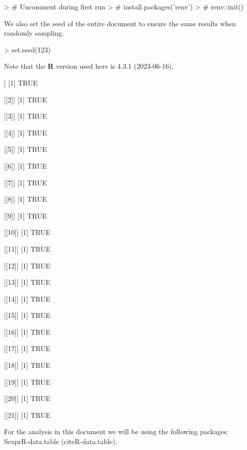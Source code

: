 \documentclass{article}
\begin{document}
\begin{Schunk}
\begin{Sinput}
> # Uncomment during first run
> # install.packages('renv')
> # renv::init()
\end{Sinput}
\end{Schunk}

We also set the seed of the entire document to ensure the same results when randomly sampling.

\begin{Schunk}
\begin{Sinput}
> set.seed(123)
\end{Sinput}
\end{Schunk}


Note that the \textbf{R} version used here is 4.3.1 (2023-06-16).


\begin{Schunk}
\begin{Soutput}
[[1]]
[1] TRUE

[[2]]
[1] TRUE

[[3]]
[1] TRUE

[[4]]
[1] TRUE

[[5]]
[1] TRUE

[[6]]
[1] TRUE

[[7]]
[1] TRUE

[[8]]
[1] TRUE

[[9]]
[1] TRUE

[[10]]
[1] TRUE

[[11]]
[1] TRUE

[[12]]
[1] TRUE

[[13]]
[1] TRUE

[[14]]
[1] TRUE

[[15]]
[1] TRUE

[[16]]
[1] TRUE

[[17]]
[1] TRUE

[[18]]
[1] TRUE

[[19]]
[1] TRUE

[[20]]
[1] TRUE

[[21]]
[1] TRUE
\end{Soutput}
\end{Schunk}


 
For the analysis in this document we will be using the following packages: Sexpr{R-data.table} (cite{R-data.table}).

\end{document}
